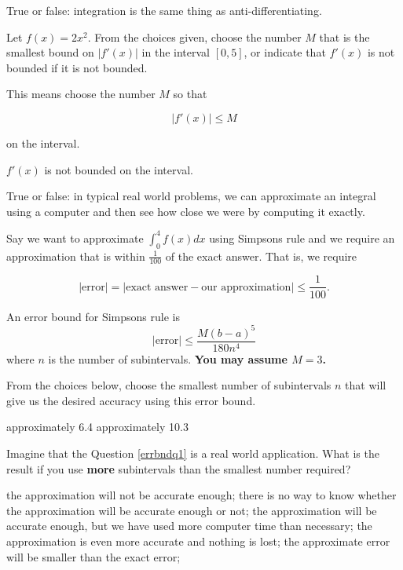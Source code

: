 \documentclass[10pt]{exam}
\begin{document}
\begin{questions}
\question True or false: integration is the same thing as anti-differentiating.  


\question Let $f(x) =  2x^2$.  From the choices given, choose the number $M$ that is the smallest bound on $|f'(x)|$ in the interval $[0, 5]$, or indicate that $f'(x)$ is not bounded if it is not bounded.

This means choose the number $M$ so that 

$$|f'(x)|\leq M$$

on the interval.

\begin{choices}
\choice $f'(x)$ is not bounded on the interval.
	
\end{choices}

\question True or false: in typical real world problems, we can approximate an integral using a computer and then see how close we were by computing it exactly.


\question \label{errbndq1} Say we want to approximate $\int_0^4 f(x)dx$ using Simpsons rule and we require an approximation that is within $\frac{1}{100}$ of the exact answer.  That is, we require

$$|\text{error}| = \left| \text{exact answer} - \text{our approximation}\right|\leq \frac{1}{100}.$$

An error bound for Simpsons rule is 
$$|\text{error}| \leq \frac{M(b-a)^5}{180n^4}$$
where $n$ is the number of subintervals.  \textbf{You may assume $M = 3$.}

From the choices below, choose the smallest number of subintervals $n$ that will give us the desired accuracy using this error bound.


\begin{choices}
\choice approximately 6.4
\choice approximately 10.3	
\end{choices}




\question Imagine that the Question \ref{errbndq1} is a real world application.  What is the result if you use \textbf{more} subintervals than the smallest number required?

\begin{choices}
\choice the approximation will not be accurate enough;
\choice there is no way to know whether the approximation will be accurate enough or not;
\choice the approximation will be accurate enough, but we have used more computer time than necessary;
\choice the approximation is even more accurate and nothing is lost;
\choice the approximate error will be smaller than the exact error;
\end{choices}
 



\end{questions}
\end{document}
